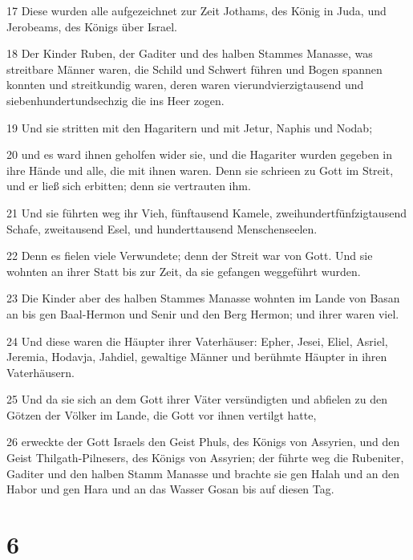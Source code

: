 \par 17 Diese wurden alle aufgezeichnet zur Zeit Jothams, des König in Juda, und Jerobeams, des Königs über Israel.
\par 18 Der Kinder Ruben, der Gaditer und des halben Stammes Manasse, was streitbare Männer waren, die Schild und Schwert führen und Bogen spannen konnten und streitkundig waren, deren waren vierundvierzigtausend und siebenhundertundsechzig die ins Heer zogen.
\par 19 Und sie stritten mit den Hagaritern und mit Jetur, Naphis und Nodab;
\par 20 und es ward ihnen geholfen wider sie, und die Hagariter wurden gegeben in ihre Hände und alle, die mit ihnen waren. Denn sie schrieen zu Gott im Streit, und er ließ sich erbitten; denn sie vertrauten ihm.
\par 21 Und sie führten weg ihr Vieh, fünftausend Kamele, zweihundertfünfzigtausend Schafe, zweitausend Esel, und hunderttausend Menschenseelen.
\par 22 Denn es fielen viele Verwundete; denn der Streit war von Gott. Und sie wohnten an ihrer Statt bis zur Zeit, da sie gefangen weggeführt wurden.
\par 23 Die Kinder aber des halben Stammes Manasse wohnten im Lande von Basan an bis gen Baal-Hermon und Senir und den Berg Hermon; und ihrer waren viel.
\par 24 Und diese waren die Häupter ihrer Vaterhäuser: Epher, Jesei, Eliel, Asriel, Jeremia, Hodavja, Jahdiel, gewaltige Männer und berühmte Häupter in ihren Vaterhäusern.
\par 25 Und da sie sich an dem Gott ihrer Väter versündigten und abfielen zu den Götzen der Völker im Lande, die Gott vor ihnen vertilgt hatte,
\par 26 erweckte der Gott Israels den Geist Phuls, des Königs von Assyrien, und den Geist Thilgath-Pilnesers, des Königs von Assyrien; der führte weg die Rubeniter, Gaditer und den halben Stamm Manasse und brachte sie gen Halah und an den Habor und gen Hara und an das Wasser Gosan bis auf diesen Tag.

\chapter{6}

